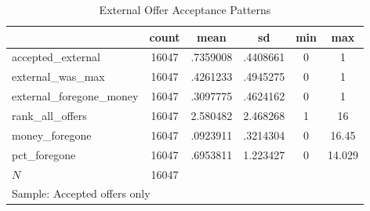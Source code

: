 \begin{table}[htbp]\centering
\def\sym#1{\ifmmode^{#1}\else\(^{#1}\)\fi}
\caption{External Offer Acceptance Patterns}
\begin{tabular}{l*{1}{ccccc}}
\hline\hline
            &       count&        mean&          sd&         min&         max\\
\hline
accepted\_external&       16047&    .7359008&    .4408661&           0&           1\\
external\_was\_max&       16047&    .4261233&    .4945275&           0&           1\\
external\_foregone\_money&       16047&    .3097775&    .4624162&           0&           1\\
rank\_all\_offers&       16047&    2.580482&    2.468268&           1&          16\\
money\_foregone&       16047&    .0923911&    .3214304&           0&       16.45\\
pct\_foregone&       16047&    .6953811&    1.223427&           0&      14.029\\
\hline
\(N\)       &       16047&            &            &            &            \\
\hline\hline
\multicolumn{6}{l}{\footnotesize Sample: Accepted offers only}\\
\end{tabular}
\end{table}

